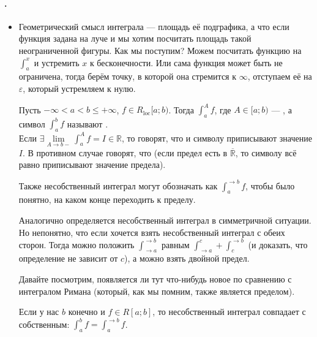 \documentclass{article}
\begin{document}
    \paragraph{.}
    \begin{itemize}
        \item[]
        \begin{Comment}
            Геометрический смысл интеграла --- площадь её подграфика, а что если функция задана на луче и мы хотим посчитать площадь такой неограниченной фигуры. Как мы поступим? Можем посчитать функцию на $\int_a^x$ и устремить $x$ к бесконечности. Или сама функция может быть не ограничена, тогда берём точку, в которой она стремится к $\infty$, отступаем её на $\varepsilon$, который устремляем к нулю.
        \end{Comment}
        \dfn Пусть $-\infty<a<b\leqslant+\infty$, $f\in R_{\mathrm{loc}}[a;b)$. Тогда $\int_a^Af$, где $A\in[a;b)$ --- , а символ $\int_a^bf$ называют .\\
        Если $\exists\lim\limits_{A\to b-}\int_a^Af=I\in\mathbb R$, то говорят, что  и символу приписывают значение $I$. В противном случае говорят, что  (если предел есть в $\overline{\mathbb R}$, то символу всё равно приписывают значение предела).
        \begin{Comment}
            Также несобственный интеграл могут обозначать как $\int_a^{\to b}f$, чтобы было понятно, на каком конце переходить к пределу.
        \end{Comment}
        \begin{Comment}
            Аналогично определяется несобственный интеграл в симметричной ситуации. Но непонятно, что если хочется взять несобственный интеграл с обеих сторон. Тогда можно положить $\int_{\to a}^{\to b}$ равным $\int_{\to a}^{c}+\int_{c}^{\to b}$ (и доказать, что определение не зависит от $c$), а можно взять двойной предел.
        \end{Comment}
        \begin{Comment}
            Давайте посмотрим, появляется ли тут что-нибудь новое по сравнению с интегралом Римана (который, как мы помним, также является пределом).
        \end{Comment}
        \thm Если у нас $b$ конечно и $f\in R[a;b]$, то несобственный интеграл совпадает с собственным: $\int_a^bf=\int_a^{\to b}f$.

\end{itemize}
\end{document}

